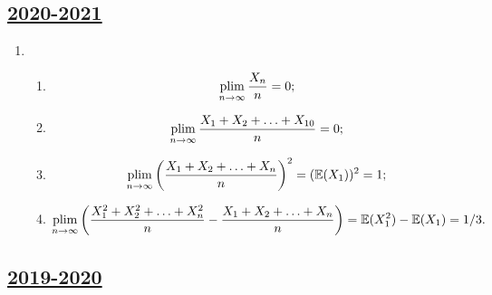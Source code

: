 \subsection[2020-2021]{\hyperref[sec:sol_kr_02_2020_2021]{2020-2021}}
\label{sec:sol_kr_02_2020_2021}

\begin{enumerate}
	\item 
	\begin{enumerate}
		\item 
		\[
			\operatorname*{plim}_{n\to\infty} \frac{X_n}{n} = 0;
		\]
		\item 
		\[ 
			\operatorname*{plim}_{n\to\infty} \frac{X_1 + X_2 + \ldots + X_{10}}{n} = 0;
		\]
		\item 
		\[
			 \operatorname*{plim}_{n\to\infty} \left(\frac{X_1 + X_2 + \ldots + X_n}{n}\right)^2 = (\operatorname{\mathbb{E}}(X_1))^2 = 1;
		\]
		
		\item 
		\[
			 \operatorname*{plim}_{n\to\infty} \left(\frac{X_1^2 + X_2^2 + \ldots + X_{n}^2}{n} - \frac{X_1 + X_2 + \ldots + X_{n}}{n}\right) = \operatorname{\mathbb{E}}(X_1^2) - \operatorname{\mathbb{E}}(X_1) = 1/3.
		\]
	\end{enumerate}

\end{enumerate}


\subsection[2019-2020]{\hyperref[sec:kr_02_2019_2020]{2019-2020}}
\label{sec:sol_kr_02_2019_2020}


